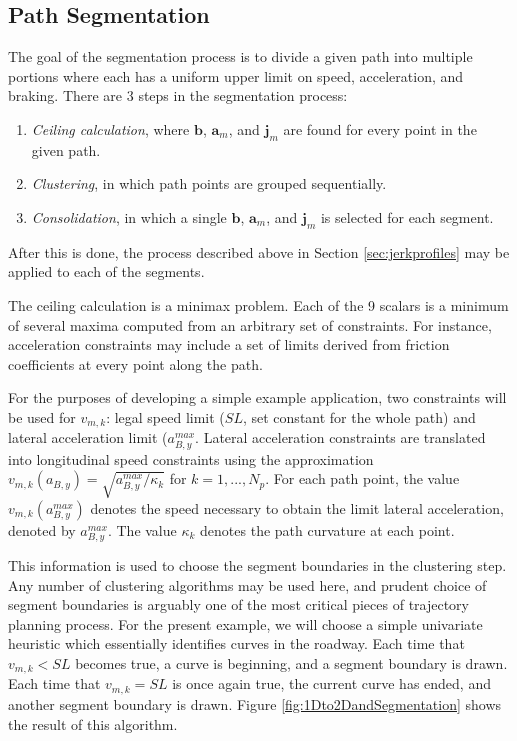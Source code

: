 \documentclass[letterpaper, 10 pt, conference]{ieeeconf}  %
\begin{document}

\subsection{Path Segmentation} \label{sec:pathsegmentation}

The goal of the segmentation process is to divide a given path into multiple portions where each has a uniform upper limit on speed, acceleration, and braking.
There are 3 steps in the segmentation process:
\begin{enumerate} \label{asdf}
  \item \emph{Ceiling calculation}, where $\mathbf{b}$, $\mathbf{a}_m$, and $\mathbf{j}_m$ are found for every point in the given path.
  \item \emph{Clustering}, in which path points are grouped sequentially.
  \item \emph{Consolidation}, in which a single $\mathbf{b}$, $\mathbf{a}_m$, and $\mathbf{j}_m$ is selected for each segment.
\end{enumerate}
After this is done, the process described above in Section \ref{sec:jerkprofiles} may be applied to each of the segments.

The ceiling calculation is a minimax problem.
Each of the 9 scalars is a minimum of several maxima computed from an arbitrary set of constraints.
For instance, acceleration constraints may include a set of limits derived from friction coefficients at every point along the path.

For the purposes of developing a simple example application, two constraints will be used for $v_{m,k}$: legal speed limit ($SL$, set constant for the whole path) and lateral acceleration limit ($a_{B,y}^{max}$. 
Lateral acceleration constraints are translated into longitudinal speed constraints using the approximation $v_{m,k}(a_{B,y}) = \sqrt{a_{B,y}^{max}/\kappa_k}$ for $k = 1, ..., N_p$.
For each path point, the value $v_{m,k}(a_{B,y}^{max})$ denotes the speed necessary to obtain the limit lateral acceleration, denoted by $a^{max}_{B,y}$.
The value $\kappa_k$ denotes the path curvature at each point.

This information is used to choose the segment boundaries in the clustering step.
Any number of clustering algorithms may be used here, and prudent choice of segment boundaries is arguably one of the most critical pieces of trajectory planning process.
For the present example, we will choose a simple univariate heuristic which essentially identifies curves in the roadway.
Each time that $v_{m,k} < SL$ becomes true, a curve is beginning, and a segment boundary is drawn.
Each time that $v_{m,k} = SL$ is once again true, the current curve has ended, and another segment boundary is drawn.
Figure \ref{fig:1Dto2DandSegmentation} shows the result of this algorithm. 
\end{document}

